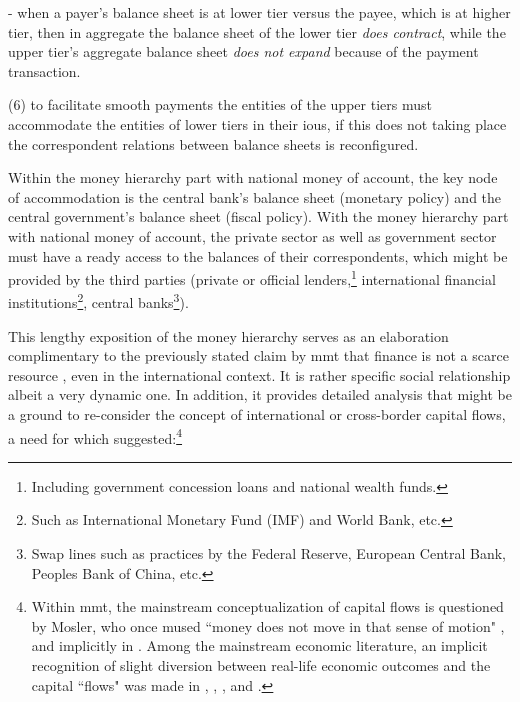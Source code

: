 -   when a payer's balance sheet is at lower tier versus the payee,
    which is at higher tier, then in aggregate the balance sheet of the
    lower tier \textit{does contract}, while the upper tier's aggregate balance
    sheet \textit{does not expand} because of the payment transaction.

(6) to facilitate smooth payments the entities of the upper tiers must
    accommodate the entities of lower tiers in their \acp{iou}, if this does
    not taking place the correspondent relations between balance sheets
    is reconfigured.

Within the money hierarchy part with national money of account, the
key node of accommodation is the central bank's balance sheet (monetary
policy) and the central government's balance sheet (fiscal policy). With
the money hierarchy part with national money of account, the
private sector as well as government sector must have a ready access to
the balances of their correspondents, which might be provided by the
third parties (private or official lenders,\footnote{Including government concession loans and national wealth funds.} international financial institutions\footnote{Such as International Monetary Fund (IMF) and World Bank, etc.}, central banks\footnote{Swap lines such as practices by the Federal Reserve, European Central Bank, Peoples Bank of China, etc.}).

This lengthy exposition of the money hierarchy serves as an elaboration
complimentary to the previously stated claim by \ac{mmt} that finance is not
a scarce resource \citep[p.~139]{wray2020}, even in the international context.
It is rather specific social relationship albeit a very dynamic one. In
addition, it provides detailed analysis that might be a ground to
re-consider the concept of international or cross-border capital flows,
a need for which \citep{woodruff2005} suggested:\footnote{Within \ac{mmt}, the mainstream conceptualization of capital flows is questioned by Mosler, who once mused ``money does not move in that sense of motion" \citep{mosler2022}, and implicitly in \citep{newman}. Among the mainstream economic literature, an implicit recognition of slight diversion between real-life economic outcomes and the capital ``flows" was made in \citep[pp.~2-6]{hewson1975}, \citep[p.~216]{stigum2007}, \citep{feygin2020}, and \citep[p.~6]{bis2020}.}

